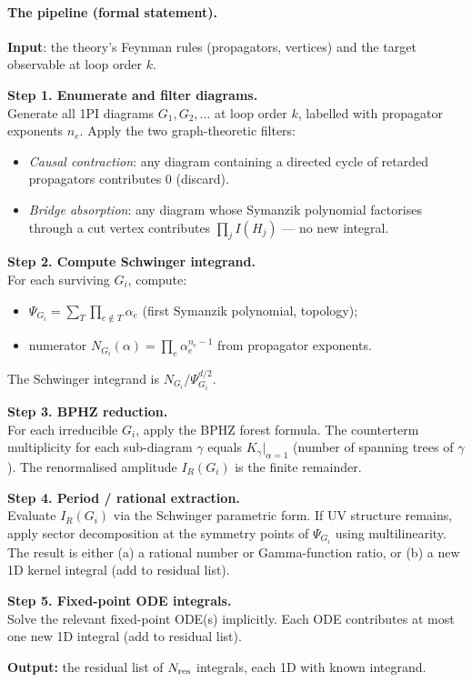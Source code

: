\documentclass[10pt,a4paper,twocolumn]{article}
\theoremstyle{plain}
\theoremstyle{definition}
\renewcommand{\Psi}{\varPsi}
\newcommand{\Nres}{N_{\rm res}}
\begin{document}
\paragraph{The pipeline (formal statement).}
\textbf{Input}: the theory's Feynman rules (propagators, vertices)
and the target observable at loop order $k$.
\begin{pipelinebox}
\noindent\textbf{Step 1. Enumerate and filter diagrams.}\\
Generate all 1PI diagrams $G_1,G_2,\ldots$ at loop order $k$,
labelled with propagator exponents $n_e$.  Apply the two
graph-theoretic filters:
\begin{itemize}[leftmargin=1.2em,itemsep=1pt,topsep=2pt]
  \item \emph{Causal contraction}: any diagram containing a
    directed cycle of retarded propagators contributes $0$
    (discard).
  \item \emph{Bridge absorption}: any diagram whose Symanzik
    polynomial factorises through a cut vertex contributes
    $\prod_j I(H_j)$ --- no new integral.
\end{itemize}

\smallskip\noindent\textbf{Step 2. Compute Schwinger integrand.}\\
For each surviving $G_i$, compute:
\begin{itemize}[leftmargin=1.2em,itemsep=1pt,topsep=2pt]
  \item $\Psi_{G_i} = \sum_{T}\prod_{e\notin T}\!\alpha_e$
    (first Symanzik polynomial, topology);
  \item numerator $N_{G_i}(\alpha) = \prod_e \alpha_e^{n_e-1}$
    from propagator exponents.
\end{itemize}
The Schwinger integrand is $N_{G_i}/\Psi_{G_i}^{d/2}$.

\smallskip\noindent\textbf{Step 3. BPHZ reduction.}\\
For each irreducible $G_i$, apply the BPHZ forest formula.
The counterterm multiplicity for each sub-diagram $\gamma$ equals
$K_\gamma|_{\alpha=1}$ (number of spanning trees of $\gamma$).
The renormalised amplitude $I_R(G_i)$ is the finite remainder.

\smallskip\noindent\textbf{Step 4. Period / rational extraction.}\\
Evaluate $I_R(G_i)$ via the Schwinger parametric form.
If UV structure remains, apply sector decomposition at the
symmetry points of $\Psi_{G_i}$ using multilinearity.
The result is either (a) a rational number or Gamma-function
ratio, or (b) a new 1D kernel integral (add to residual list).

\smallskip\noindent\textbf{Step 5. Fixed-point ODE integrals.}\\
Solve the relevant fixed-point ODE(s) implicitly.  Each ODE
contributes at most one new 1D integral (add to residual list).

\smallskip\noindent\textbf{Output:} the residual list of
$\Nres$ integrals, each 1D with known integrand.
\end{pipelinebox}
\end{document}
